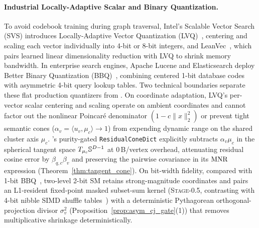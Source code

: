 \paragraph{Industrial Locally-Adaptive Scalar and Binary Quantization.}
To avoid codebook training during graph traversal, Intel's Scalable Vector Search ({SVS}) introduces Locally-Adaptive Vector Quantization ({LVQ})~\cite{aguerrebere2023similarity}, centering and scaling each vector individually into 4-bit or 8-bit integers, and {LeanVec}~\cite{tepper2024leanvec}, which pairs learned linear dimensionality reduction with {LVQ} to shrink memory bandwidth.
In enterprise search engines, Apache {Lucene} and {Elasticsearch} deploy Better Binary Quantization ({BBQ})~\cite{trent2024bbq}, combining centered 1-bit database codes with asymmetric 4-bit query lookup tables.
Two technical boundaries separate these flat production quantizers from \rquiver{}.
On coordinate adaptation, {LVQ}'s per-vector scalar centering and scaling operate on ambient coordinates and cannot factor out the nonlinear {Poincar\'e} denominator $(1 - c\|x\|_2^2)$ or prevent tight semantic cones ($\alpha_v = \langle u_v, \mu_c\rangle \to 1$) from expending dynamic range on the shared cluster axis $\mu_c$.
\rquiver{}'s purity-gated \texttt{ResidualConeDict} explicitly subtracts $\alpha_v\mu_c$ in the spherical tangent space $T_{\mu_c}\mathbb{S}^{D-1}$ at $0$\,B/vertex overhead, attenuating residual cosine error by $\beta_{q,c}\beta_v$ and preserving the pairwise covariance in its {$\mathrm{MNR}$} expression (Theorem~\ref{thm:tangent_cone}).
On bit-width fidelity, compared with 1-bit {BBQ}~\cite{trent2024bbq}, two-level 2-bit {SM} retains strong-magnitude coordinates and pairs an L1-resident fixed-point masked subset-sum kernel (\textsc{Stage-0.5}, contrasting with 4-bit nibble {SIMD} shuffle tables~\cite{andre2015cache,andre2017accelerated}) with a deterministic Pythagorean orthogonal-projection divisor $\sigma_v^2$ (Proposition~\ref{prop:asym_cj_gate}(1)) that removes multiplicative shrinkage deterministically.

